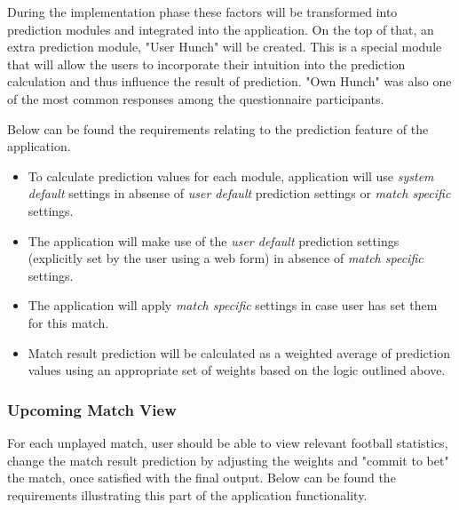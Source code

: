 During the implementation phase these factors will be transformed into prediction modules and integrated into the application. On the top of that, an extra prediction module, "User Hunch" will be created. This is a special module that will allow the users to incorporate their intuition into the prediction calculation and thus influence the result of prediction. "Own Hunch" was also one of the most common responses among the questionnaire participants.

Below can be found the requirements relating to the prediction feature of the application.

\begin{itemize}
  \item To calculate prediction values for each module, application will use \emph{system default} settings in absense of \emph{user default} prediction settings or \emph{match specific} settings.
  \item The application will make use of the \emph{user default} prediction settings (explicitly set by the user using a web form) in absence of \emph{match specific} settings.
  \item The application will apply \emph{match specific} settings in case user has set them for this match.
  \item Match result prediction will be calculated as a weighted average of prediction values using an appropriate set of weights based on the logic outlined above.
\end{itemize}

\subsubsection{Upcoming Match View}
\label{subsubsec:upcomingmatch_req}
For each unplayed match, user should be able to view relevant football statistics, change the match result prediction by adjusting the weights and "commit to bet" the match, once satisfied with the final output. Below can be found the requirements illustrating this part of the application functionality.

